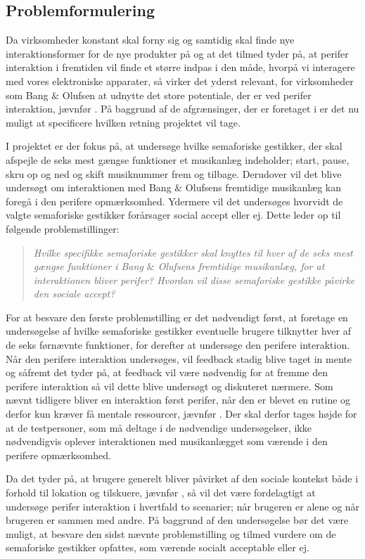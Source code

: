 \subsection{Problemformulering}
\label{Problemformulering}
%
Da virksomheder konstant skal forny sig og samtidig skal finde nye interaktionsformer for de nye produkter på og at det tilmed tyder på, at perifer interaktion i fremtiden vil finde et større indpas i den måde, hvorpå vi interagere med vores elektroniske apparater, så virker det yderst relevant, for virksomheder som Bang $\&$ Olufsen at udnytte det store potentiale, der er ved perifer interaktion, jævnfør . På baggrund af de afgrænsinger, der er foretaget i  er det nu muligt at specificere hvilken retning projektet vil tage.  

I projektet er der fokus på, at undersøge hvilke semaforiske gestikker, der skal afspejle de seks mest gængse funktioner et musikanlæg indeholder; start, pause, skru op og ned og skift musiknummer frem og tilbage. Derudover vil det blive undersøgt om interaktionen med Bang $\&$ Olufsens fremtidige musikanlæg kan foregå i den perifere opmærksomhed. Ydermere vil det undersøges hvorvidt de valgte semaforiske gestikker forårsager social accept eller ej. Dette leder op til følgende problemstillinger:\blankline
%
\begin{quotation}
\noindent
\textit{Hvilke specifikke semaforiske gestikker skal knyttes til hver af de seks mest gængse funktioner i Bang $\&$ Olufsens fremtidige musikanlæg, for at interaktionen bliver perifer?\blankline
%
Hvordan vil disse semaforiske gestikke påvirke den sociale accept?}\blankline
\end{quotation}
%
For at besvare den første problemstilling er det nødvendigt først, at foretage en undersøgelse af hvilke semaforiske gestikker eventuelle brugere tilknytter hver af de seks førnævnte funktioner, for derefter at undersøge den perifere interaktion. Når den perifere interaktion undersøges, vil feedback stadig blive taget in mente og såfremt det tyder på, at feedback vil være nødvendig for at fremme den perifere interaktion så vil dette blive undersøgt og diskuteret nærmere. Som nævnt tidligere bliver en interaktion først perifer, når den er blevet en rutine og derfor kun kræver få mentale ressourcer, jævnfør . Der skal derfor tages højde for at de testpersoner, som må deltage i de nødvendige undersøgelser, ikke nødvendigvis oplever interaktionen med musikanlægget som værende i den perifere opmærksomhed.    

Da det tyder på, at brugere generelt bliver påvirket af den sociale kontekst både i forhold til lokation og tilskuere, jævnfør , så vil det være fordelagtigt at undersøge perifer interaktion i hvertfald to scenarier; når brugeren er alene og når brugeren er sammen med andre. På baggrund af den undersøgelse bør det være muligt, at besvare den sidst nævnte problemstilling og tilmed vurdere om de semaforiske gestikker opfattes, som værende socialt acceptable eller ej. 



